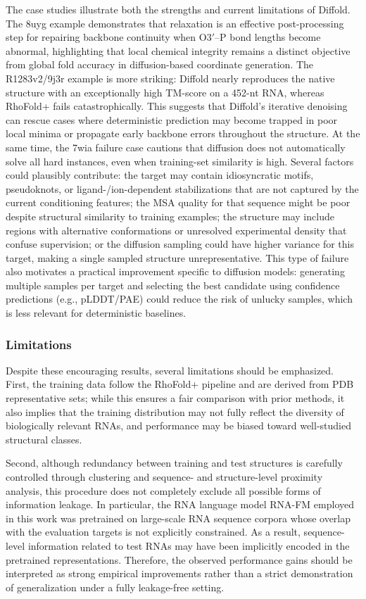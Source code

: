 The case studies illustrate both the strengths and current limitations of Diffold. The 8uyg example demonstrates that relaxation is an effective post-processing step for repairing backbone continuity when $\text{O3}'–\text{P}$ bond lengths become abnormal, highlighting that local chemical integrity remains a distinct objective from global fold accuracy in diffusion-based coordinate generation. The R1283v2/9j3r example is more striking: Diffold nearly reproduces the native structure with an exceptionally high TM-score on a 452-nt RNA, whereas RhoFold+ fails catastrophically. This suggests that Diffold’s iterative denoising can rescue cases where deterministic prediction may become trapped in poor local minima or propagate early backbone errors throughout the structure. At the same time, the 7wia failure case cautions that diffusion does not automatically solve all hard instances, even when training-set similarity is high. Several factors could plausibly contribute: the target may contain idiosyncratic motifs, pseudoknots, or ligand-/ion-dependent stabilizations that are not captured by the current conditioning features; the MSA quality for that sequence might be poor despite structural similarity to training examples; the structure may include regions with alternative conformations or unresolved experimental density that confuse supervision; or the diffusion sampling could have higher variance for this target, making a single sampled structure unrepresentative. This type of failure also motivates a practical improvement specific to diffusion models: generating multiple samples per target and selecting the best candidate using confidence predictions (e.g., pLDDT/PAE) could reduce the risk of unlucky samples, which is less relevant for deterministic baselines.

\subsubsection{Limitations}
Despite these encouraging results, several limitations should be emphasized.  
First, the training data follow the RhoFold+ pipeline and are derived from PDB representative sets; while this ensures a fair comparison with prior methods, it also implies that the training distribution may not fully reflect the diversity of biologically relevant RNAs, and performance may be biased toward well-studied structural classes.

Second, although redundancy between training and test structures is carefully controlled through clustering and sequence- and structure-level proximity analysis, this procedure does not completely exclude all possible forms of information leakage. In particular, the RNA language model RNA-FM employed in this work was pretrained on large-scale RNA sequence corpora whose overlap with the evaluation targets is not explicitly constrained. As a result, sequence-level information related to test RNAs may have been implicitly encoded in the pretrained representations. Therefore, the observed performance gains should be interpreted as strong empirical improvements rather than a strict demonstration of generalization under a fully leakage-free setting.

